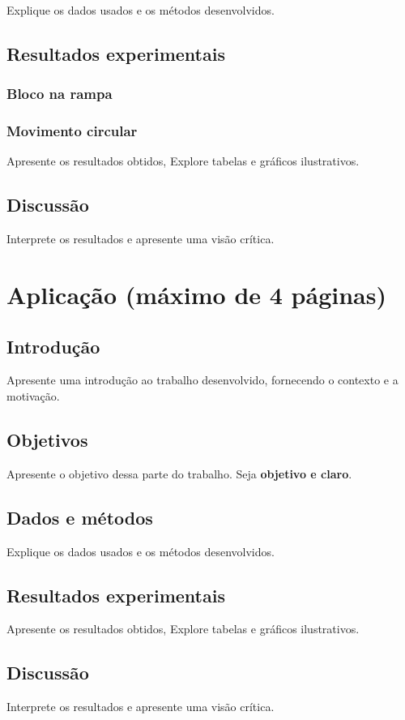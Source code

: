 \documentclass{article}
\begin{document}
\vspace{0.5cm}


\qquad
Explique os dados usados e os métodos desenvolvidos.

\subsection{Resultados experimentais}

\subsubsection{Bloco na rampa}

\subsubsection{Movimento circular}

Apresente os resultados obtidos, Explore tabelas e gráficos ilustrativos.

\subsection{Discussão}

Interprete os resultados e apresente uma visão crítica.

\newpage

\section{Aplicação (máximo de 4 páginas)}

\subsection{Introdução}

Apresente uma introdução ao trabalho desenvolvido, fornecendo o contexto e a motivação.

\subsection{Objetivos}

Apresente o objetivo dessa parte do trabalho. Seja {\bf objetivo e claro}.

\subsection{Dados e métodos}

Explique os dados usados e os métodos desenvolvidos.

\subsection{Resultados experimentais}

Apresente os resultados obtidos, Explore tabelas e gráficos ilustrativos.

\subsection{Discussão}

Interprete os resultados e apresente uma visão crítica.
\end{document}
